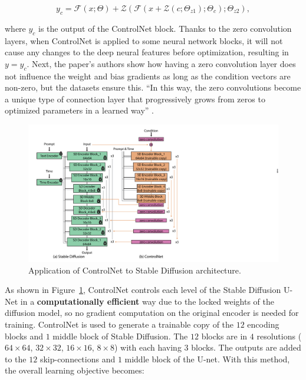 \documentclass[preprint]{elsarticle}
\begin{document}
\begin{equation}
	y_c = \mathcal{F}(x;\Theta) + \mathcal{Z}(\mathcal{F}(x+\mathcal{Z}(c;\Theta_{z1});\Theta_c);\Theta_{z2}),
\end{equation}

where $y_c$ is the output of the ControlNet block. Thanks to the zero convolution layers, when ControlNet is applied to some neural network blocks,  it will not cause any changes to the deep neural features before optimization, resulting in $y=y_c$.
Next, the paper's authors show how having a zero convolution layer does not influence the weight 
and bias gradients as long as the condition vectors are non-zero, but the datasets ensure this.
``In this way, the zero convolutions become a unique type of connection layer that progressively grows from zeros to
optimized parameters in a learned way'' \cite{zhang2023adding}.

\begin{figure}[t]
	\centering
    \includegraphics[scale=0.8]{img/svg/Controlnet2.png}
	\caption{Application of ControlNet to Stable Diffusion architecture.}\label{fig:controlnet-2}
\end{figure}


As shown in Figure~\ref{fig:controlnet-2}, ControlNet controls each level of the Stable Diffusion U-Net in a \textbf{computationally efficient} way due to the locked weights of the diffusion model, so no gradient computation on the original encoder is needed for training. 
ControlNet is used to generate a trainable copy of the $12$ encoding blocks and $1$ middle block of Stable Diffusion. The $12$ blocks are in $4$ resolutions ($64 \times 64$, $32 \times 32$, $16 \times 16$, $8 \times 8$) with each having $3$ blocks. The outputs are added to the $12$ skip-connections and $1$ middle block of the U-net. With this method, the overall learning objective becomes:
\end{document}
